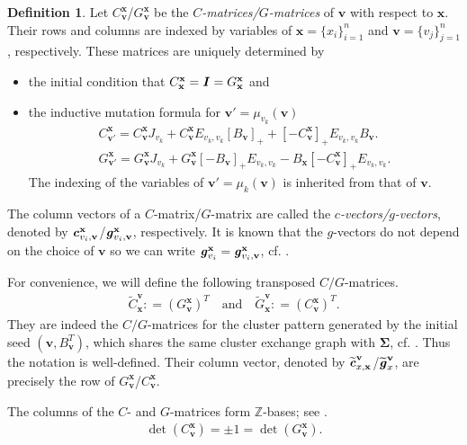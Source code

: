 \documentclass[11pt,reqno]{amsart}
\theoremstyle{plain}
\theoremstyle{definition}
\newtheorem{definition}[theorem]{Definition}
\numberwithin{equation}{section}
\newcommand\ZZ{\mathbb{Z}}
\newcommand\<{\langle}
\renewcommand\>{\rangle}
\def\vv{\mathbf{v}}
\newcommand{\bfit}[1]{\textbf{\textit{#1}}}
\def\seeds{\mathbf{\Sigma}}
\def\xx{\mathbf{x}}%
\newcommand{\pos}[1]{[#1]_+}
\def\cvec{\bfit{c}}
\def\gvec{\bfit{g}}
\def\Cmat{{C}}
\def\Gmat{{G}}
\def\tgvec{\widetilde{\gvec}}
\begin{document}
\begin{definition}\label{def:CG}
Let $\Cmat^{\xx}_{\vv}$/$\Gmat^{\xx}_{\vv}$ be the \emph{$C$-matrices/$G$-matrices} of $\vv$ with respect to $\xx$.
Their rows and columns are indexed by variables of $\xx=\{x_i\}_{i=1}^n$ and $\vv=\{v_j\}_{j=1}^n$, respectively.
These matrices are uniquely determined by
\begin{itemize}
  \item the initial condition that $\Cmat^\xx_\xx=\bfit{I}=\Gmat^\xx_\xx$ and
  \item the inductive mutation formula for $\vv'=\mu_{v_k}(\vv)$
    \begin{gather}
    \label{eq:mutC} \Cmat^{\xx}_{\vv'}=\Cmat^{\xx}_{\vv}J_{v_k}+\Cmat^{\xx}_{\vv}E_{v_k,v_k}\pos{B_\vv}+\pos{-\Cmat^{\xx}_{\vv}}E_{v_k,v_k} B_\vv.\\
    \label{eq:mutG}\Gmat^{\xx}_{\vv'}=\Gmat^{\xx}_{\vv}J_{v_k}+\Gmat^{\xx}_{\vv}\pos{-B_\vv}E_{v_k,v_k}- B_{\xx}\pos{-\Cmat^{\xx}_{\vv}}E_{v_k,v_k}.
    \end{gather}
The indexing of the variables of $\vv'=\mu_k(\vv)$ is inherited from that of $\vv$.
\end{itemize}
The column vectors of a $C$-matrix/$G$-matrix are called the \emph{$c$-vectors/$g$-vectors}, denoted by $\cvec^\xx_{v_i,\vv}$/$\gvec^\xx_{v_i,\vv}$, respectively.
It is known that the $g$-vectors do not depend on the choice of $\vv$ so we can write $\gvec^\xx_{v_i}=\gvec^\xx_{v_i,\vv}$,
cf. \cite[Part.~I, Def.~4.8]{Nak}.

For convenience, we will define the following transposed $C/G$-matrices.
\begin{gather}\label{eq:dual3}
    \widetilde{\Cmat}^{\vv}_{\xx}\colon=(\Gmat^{\xx}_\vv)^T
    \quad\text{and}\quad
    \widetilde{\Gmat}^{\vv}_{\xx}\colon=(\Cmat^{\xx}_\vv)^T. 
\end{gather}
They are indeed the $C/G$-matrices for the cluster pattern generated by the initial seed $(\vv,B^T_\vv)$, which shares the same cluster exchange graph with $\seeds$, cf. \cite{NZ}.
Thus the notation is well-defined.
Their column vector, 
denoted by $\widetilde{\cvec}^{\vv}_{x,\xx}$/$\tgvec^{\vv}_x$, are precisely the row of $\Gmat^\xx_\vv$/$\Cmat^\xx_\vv$.
\end{definition}

The columns of the $C$- and $G$-matrices form $\ZZ$-bases; see \cite[Prop.~4.2]{NZ}.
\begin{gather}\label{eq:det1}
    \det(\Cmat^\xx_\vv)=\pm1=\det(\Gmat^\xx_\vv).
\end{gather}
\end{document}
